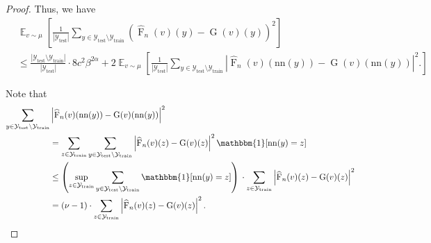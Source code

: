 \documentclass[11pt]{article}
\theoremstyle{plain}
\newcommand{\Ycal}{\mathcal{Y}}
\DeclareMathOperator*{\expect}{\mathbb{E}}
\newcommand{\indicator}{\mathbbm{1}}
\begin{document}
\begin{proof}
Thus, we have
\begin{equation*}
\begin{split}
&\expect_{v \sim \mu} \left[ \frac{1}{|\mathcal{Y}_{\mathrm{test}}|} \sum_{y \in \mathcal{Y}_{\mathrm{test}} \setminus \mathcal{Y}_{\mathrm{train}}} \left( \widehat{\operatorname{F}}_n(v)(y) - \operatorname{G}(v)(y) \right)^2 \right] \\
&\leq  \frac{|\Ycal_{\mathrm{test}} \setminus \Ycal_{\mathrm{train}}|}{|\Ycal_{\mathrm{test}}|}\cdot 8c^2 \beta^{2\alpha}+ 2\expect_{v \sim \mu} \left[ \frac{1}{|\mathcal{Y}_{\mathrm{test}}|} \sum_{y \in \mathcal{Y}_{\mathrm{test}} \setminus \mathcal{Y}_{\mathrm{train}}} \left| \widehat{\operatorname{F}}_n(v)(\mathrm{nn}(y)) - \operatorname{G}(v)(\mathrm{nn}(y)) \right|^2. \right]
\end{split}
\end{equation*}



Note that
\begin{equation*}
    \begin{split}
        \sum_{y \in \mathcal{Y}_{\mathrm{test}} \setminus \mathcal{Y}_{\mathrm{train}}} &\left| \widehat{\operatorname{F}}_n(v)(\mathrm{nn}(y)) - \operatorname{G}(v)(\mathrm{nn}(y)) \right|^2\\
        &= \sum_{z \in \Ycal_{\mathrm{train}}}   \sum_{y \in \mathcal{Y}_{\mathrm{test}} \setminus \mathcal{Y}_{\mathrm{train}}} \left| \widehat{\operatorname{F}}_n(v)(z) - \operatorname{G}(v)(z) \right|^2 \indicator[\text{nn}(y)=z]\\
        &\leq \left(\sup_{z \in \Ycal_{\mathrm{train}}}  \sum_{y \in \mathcal{Y}_{\mathrm{test}} \setminus \mathcal{Y}_{\mathrm{train}}} \indicator[\mathrm{nn}(y)=z]\right)\, \cdot  \sum_{z \in \Ycal_{\mathrm{train}}} \left| \widehat{\operatorname{F}}_n(v)(z) - \operatorname{G}(v)(z) \right|^2\\
        &= (\nu-1) \cdot  \sum_{z \in \Ycal_{\mathrm{train}}} \left| \widehat{\operatorname{F}}_n(v)(z) - \operatorname{G}(v)(z) \right|^2.
    \end{split}
\end{equation*}


\end{proof}
\end{document}
